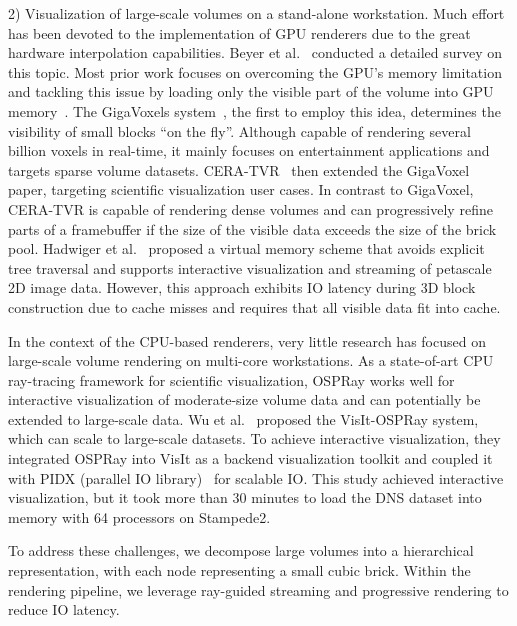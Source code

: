 2) Visualization of large-scale volumes on a stand-alone workstation.
Much effort has been devoted to the implementation of GPU renderers
due to the great hardware interpolation capabilities\cite{feng2015parallel,clyne2007interactive}.
Beyer et al.~\cite{beyer2014survey} conducted a detailed survey on this topic. Most prior work focuses on overcoming the GPU's
memory limitation and tackling this issue by loading only the visible
part of the volume into GPU memory~\cite{li2003empty}. 
The GigaVoxels system~\cite{crassin2007interactive,crassin2009gigavoxels}, the first to employ this idea, determines the visibility of
small blocks ``on the fly''.  
Although capable of rendering several billion voxels in real-time,
it mainly focuses on entertainment applications and targets sparse volume datasets.
CERA-TVR~\cite{engel2011cera} then extended the GigaVoxel paper, 
targeting scientific visualization user cases.
In contrast to GigaVoxel, CERA-TVR is capable of rendering dense volumes
and can progressively refine parts of a framebuffer if the size of the visible
data exceeds the size of the brick pool.
Hadwiger et al.~\cite{hadwiger2012interactive} proposed a virtual memory scheme
that avoids explicit tree traversal and supports interactive visualization and 
streaming of petascale 2D image data. However, this approach exhibits
IO latency during 3D block construction due to cache misses and requires that all
visible data fit into cache. 


In the context of the CPU-based renderers, very little research has focused
on large-scale volume rendering on multi-core workstations.
As a state-of-art CPU ray-tracing framework for scientific visualization,
OSPRay works well for interactive visualization of moderate-size volume data
and can potentially be extended to large-scale data.
Wu et al.~\cite{wu2018visit} proposed the VisIt-OSPRay system, which can scale to
large-scale datasets. To achieve interactive visualization, they integrated OSPRay
into VisIt as a backend visualization toolkit and coupled it with PIDX (parallel IO 
library)~\cite{kumar2011pidx} for scalable IO. 
This study achieved interactive visualization, but it took more than 30 minutes to load the DNS 
dataset into memory with 64 processors on Stampede2.

To address these challenges, we decompose large volumes into a hierarchical 
representation, with each node representing a small cubic brick. Within the rendering pipeline,
we leverage ray-guided streaming and progressive rendering to reduce IO latency.


